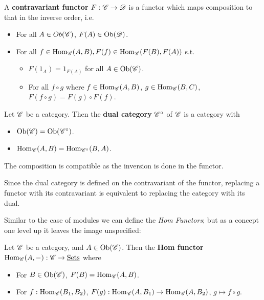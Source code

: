 \begin{definition}
    A \textbf{contravariant functor} $F: \mathscr{C} \to \mathscr{D}$ is a functor which maps composition to that in the inverse order, i.e.
    \begin{itemize}
        \item For all $A \in Ob(\mathscr{C})$, $F(A) \in \mathrm{Ob}(\mathscr{D})$.
        \item For all $f \in \mathrm{Hom}_{\mathscr{C}}(A, B), F(f) \in \mathrm{Hom}_{\mathscr{C}}(F(B), F(A))$ s.t. 
        \begin{itemize}
            \item $F(1_A) = 1_{F(A)}$ for all $A \in \mathrm{Ob}(\mathscr{C})$.
            \item For all $f \circ g$ where $f \in \mathrm{Hom}_{\mathscr{C}}(A, B)$, $g \in \mathrm{Hom}_{\mathscr{C}}(B, C)$, $F(f \circ g) = F(g) \circ F(f)$.
        \end{itemize}
    \end{itemize}
\end{definition}

\begin{definition}
    Let $\mathscr{C}$ be a category. Then the \textbf{dual category} $\mathscr{C}^{\circ}$ of $\mathscr{C}$ is a category with
    \begin{itemize}
        \item $\mathrm{Ob}(\mathscr{C}) = \mathrm{Ob}(\mathscr{C}^{\circ})$.
        \item $\mathrm{Hom}_{\mathscr{C}}(A, B) = \mathrm{Hom}_{\mathscr{C}^{\circ}}(B, A)$. 
    \end{itemize}
    The composition is compatible as the inversion is done in the functor. 
\end{definition}

\begin{remark}
    Since the dual category is defined on the contravariant of the functor, replacing a functor with its contravariant is equivalent to replacing the category with its dual.
\end{remark}

Similar to the case of modules we can define the \emph{Hom Functors}; but as a concept one level up it leaves the image unspecified:

\begin{definition}
    Let $\mathscr{C}$ be a category, and $A \in \mathrm{Ob}(\mathscr{C})$. Then the \textbf{Hom functor} $\mathrm{Hom}_{\mathscr{C}}(A, -): \mathscr{C} \to \underline{\textup{Sets}}$ where
    \begin{itemize}
        \item For $B \in \mathrm{Ob}(\mathscr{C})$, $F(B) = \mathrm{Hom}_{\mathscr{C}}(A, B)$.
        \item For $f: \mathrm{Hom}_{\mathscr{C}}(B_1, B_2)$, $F(g): \mathrm{Hom}_{\mathscr{C}}(A, B_1) \to \mathrm{Hom}_{\mathscr{C}}(A, B_2)$, $g\mapsto f \circ g$. 
    \end{itemize}
\end{definition}

